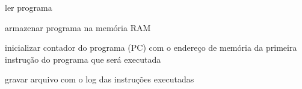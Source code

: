 \begin{algorithm}[ht]
{        \BlankLine

        ler programa

        \BlankLine

        armazenar programa na memória RAM

        \BlankLine

        inicializar contador do programa (PC) com o endereço de memória da primeira instrução do programa que será executada

        \BlankLine
        

        \BlankLine

        gravar arquivo com o log das instruções executadas

    } 

\end{algorithm}